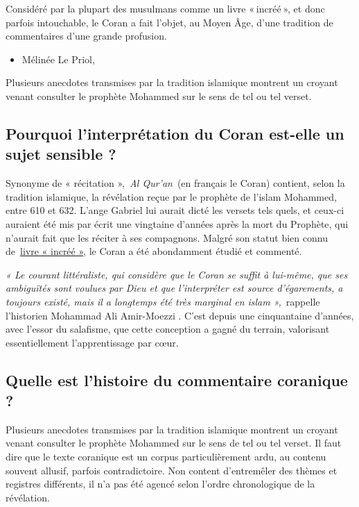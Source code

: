  

Considéré par la plupart des musulmans comme un livre « incréé », et
donc parfois intouchable, le Coran a fait l'objet, au Moyen Âge, d'une
tradition de commentaires d'une grande profusion. 

\begin{itemize}
\item
  Mélinée Le Priol,~
\end{itemize}


Plusieurs anecdotes transmises par la tradition islamique montrent un
croyant venant consulter le prophète Mohammed sur le sens de tel ou tel
verset.

\subsection{Pourquoi l'interprétation du Coran est-elle un sujet sensible
?}

Synonyme de « récitation »,~\emph{Al Qur'an}~(en français le Coran)
contient, selon la tradition islamique, la révélation reçue par le
prophète de l'islam Mohammed, entre 610 et 632. L'ange Gabriel lui
aurait dicté les versets tels quels, et ceux-ci auraient été mis par
écrit une vingtaine d'années après la mort du Prophète, qui n'aurait
fait que les réciter à ses compagnons. Malgré son statut bien connu
de~\href{https://www.la-croix.com/Religion/Islam/Comprendre-Coran-2016-06-10-1200767802}{\underline{livre
« incréé »}}, le Coran a été abondamment étudié et commenté.

\emph{« Le courant littéraliste, qui considère que le Coran se suffit à
lui-même, que ses ambiguïtés sont voulues par Dieu et que l'interpréter
est source d'égarements, a toujours existé, mais il a longtemps été très
marginal en islam »,}~rappelle l'historien Mohammad
Ali Amir-Moezzi 
 . C'est depuis une cinquantaine d'années, avec
l'essor du salafisme, que cette conception a gagné du terrain,
valorisant essentiellement l'apprentissage par cœur.
 
 

\subsection{ Quelle est l'histoire du commentaire coranique ?}

Plusieurs anecdotes transmises par la tradition islamique montrent un
croyant venant consulter le prophète Mohammed sur le sens de tel ou tel
verset. Il faut dire que le texte coranique est un corpus
particulièrement ardu, au contenu souvent allusif, parfois
contradictoire. Non content d'entremêler des thèmes et registres
différents, il n'a pas été agencé selon l'ordre chronologique de la
révélation.

